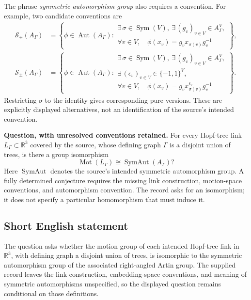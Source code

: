 \documentclass[11pt]{article}
\newcommand{\R}{\mathbb{R}}
\begin{document}
The phrase \emph{symmetric automorphism group} also requires a convention. For example, two candidate conventions are
\[
\begin{aligned}
\mathcal S_+(A_\Gamma)
&=\left\{\phi\in\operatorname{Aut}(A_\Gamma):
\begin{array}{l}
\exists\,\sigma\in\operatorname{Sym}(V),\ \exists\,(g_v)_{v\in V}\in A_\Gamma^V,\\
\forall v\in V,\quad\phi(x_v)=g_vx_{\sigma(v)}g_v^{-1}
\end{array}\right\},\\
\mathcal S_{\pm}(A_\Gamma)
&=\left\{\phi\in\operatorname{Aut}(A_\Gamma):
\begin{array}{l}
\exists\,\sigma\in\operatorname{Sym}(V),\ \exists\,(g_v)_{v\in V}\in A_\Gamma^V,\\
\exists\,(\epsilon_v)_{v\in V}\in\{-1,1\}^V,\\
\forall v\in V,\quad\phi(x_v)=g_vx_{\sigma(v)}^{\epsilon_v}g_v^{-1}
\end{array}\right\}.
\end{aligned}
\]
Restricting \(\sigma\) to the identity gives corresponding pure versions. These are explicitly displayed alternatives, not an identification of the source's intended convention.

\textbf{Question, with unresolved conventions retained.} For every Hopf-tree link \(L_\Gamma\subset\R^3\) covered by the source, whose defining graph \(\Gamma\) is a disjoint union of trees, is there a group isomorphism
\[
\operatorname{Mot}(L_\Gamma)\cong\operatorname{SymAut}(A_\Gamma)?
\]
Here \(\operatorname{SymAut}\) denotes the source's intended symmetric automorphism group. A fully determined conjecture requires the missing link construction, motion-space conventions, and automorphism convention. The record asks for an isomorphism; it does not specify a particular homomorphism that must induce it.
\subsection{Short English statement}
The question asks whether the motion group of each intended Hopf-tree link in \(\R^3\), with defining graph a disjoint union of trees, is isomorphic to the symmetric automorphism group of the associated right-angled Artin group. The supplied record leaves the link construction, embedding-space conventions, and meaning of symmetric automorphisms unspecified, so the displayed question remains conditional on those definitions.
\end{document}
